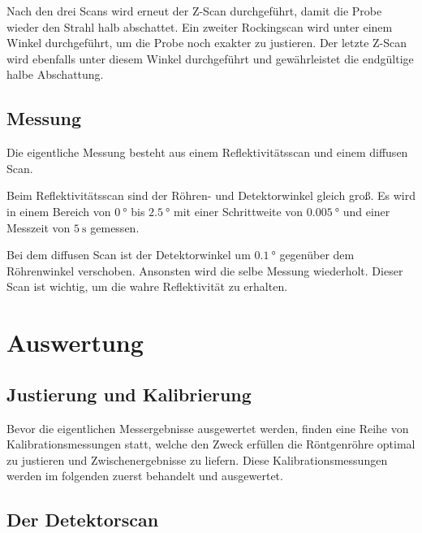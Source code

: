 Nach den drei Scans wird erneut der Z-Scan durchgeführt, damit die Probe wieder den Strahl halb abschattet.
Ein zweiter Rockingscan wird unter einem Winkel durchgeführt, um die Probe noch exakter zu justieren.
Der letzte Z-Scan wird ebenfalls unter diesem Winkel durchgeführt und gewährleistet die endgültige halbe Abschattung. %



\subsection{Messung}
Die eigentliche Messung besteht aus einem Reflektivitätsscan und einem diffusen Scan.

Beim Reflektivitätsscan sind der Röhren- und Detektorwinkel gleich groß. Es wird in einem Bereich von $\SI{0}{\degree}$ bis $\SI{2.5}{\degree}$ mit einer Schrittweite von $\SI{0.005}{\degree}$ und einer Messzeit von $\SI{5}{\second}$ gemessen.

Bei dem diffusen Scan ist der Detektorwinkel um $\SI{0.1}{\degree}$ gegenüber dem Röhrenwinkel verschoben. Ansonsten wird die selbe Messung wiederholt. Dieser Scan ist wichtig, um die wahre Reflektivität zu erhalten. %


\section{Auswertung}
\subsection{Justierung und Kalibrierung}
Bevor die eigentlichen Messergebnisse ausgewertet werden, finden eine Reihe von Kalibrationsmessungen statt,
welche den Zweck erfüllen die Röntgenröhre optimal zu justieren und Zwischenergebnisse zu liefern.
Diese Kalibrationsmessungen werden im folgenden zuerst behandelt und ausgewertet.

\subsection{Der Detektorscan}


